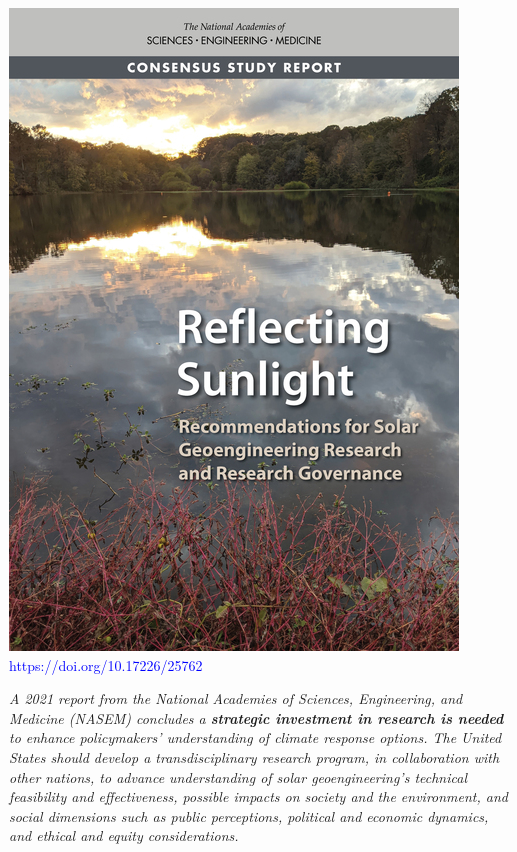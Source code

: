 \begin{multicols}{2}
	\begin{minipage}[c]{\columnwidth}\centering
		\includegraphics[width=0.8\columnwidth]{figures/25762-0309676053-450.jpg} \\
		\medskip
		\vbox{\large\textcolor{blue}{https://doi.org/10.17226/25762}}
\end{minipage}

\begin{minipage}[c]{\columnwidth}
\vbox{\large\textit{A 2021 report from the National Academies of Sciences, Engineering, and Medicine (NASEM) concludes a \textbf{strategic investment in research is needed} to enhance policymakers' understanding of climate response options. The United States should develop a transdisciplinary research program, in collaboration with other nations, to advance understanding of solar geoengineering's technical feasibility and effectiveness, possible impacts on society and the environment, and social dimensions such as public perceptions, political and economic dynamics, and ethical and equity considerations.}}
\end{minipage}
\end{multicols}

